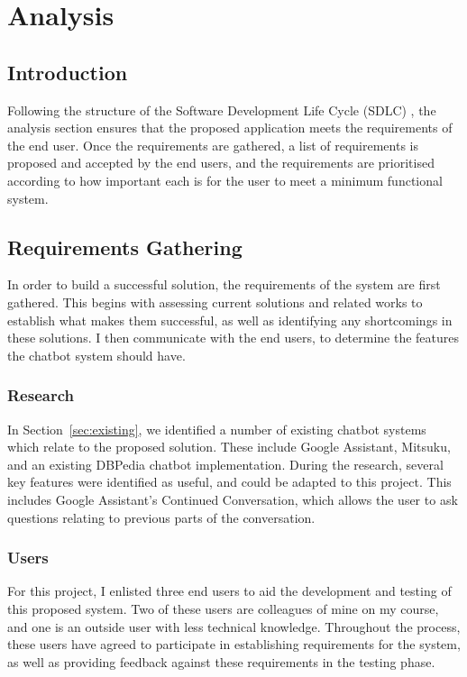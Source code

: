 \chapter{Analysis}
\label{ch:analysis}
\section{Introduction}
Following the structure of the Software Development Life Cycle (SDLC) \cite{sdlc2010}, the analysis section ensures that the proposed application meets the requirements of the end user. Once the requirements are gathered, a list of requirements is proposed and accepted by the end users, and the requirements are prioritised according to how important each is for the user to meet a minimum functional system.

\section{Requirements Gathering}
In order to build a successful solution, the requirements of the system are first gathered. This begins with assessing current solutions and related works to establish what makes them successful, as well as identifying any shortcomings in these solutions. I then communicate with the end users, to determine the features the chatbot system should have.

\subsection{Research}
In Section~\ref{sec:existing}, we identified a number of existing chatbot systems which relate to the proposed solution. These include Google Assistant, Mitsuku, and an existing DBPedia chatbot implementation. During the research, several key features were identified as useful, and could be adapted to this project. This includes Google Assistant's Continued Conversation, which allows the user to ask questions relating to previous parts of the conversation.

\subsection{Users}
For this project, I enlisted three end users to aid the development and testing of this proposed system. Two of these users are colleagues of mine on my course, and one is an outside user with less technical knowledge. Throughout the process, these users have agreed to participate in establishing requirements for the system, as well as providing feedback against these requirements in the testing phase.

